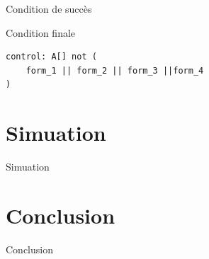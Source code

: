 \documentclass{bredelebeamer}
\begin{document}
\begin{frame}[fragile]{Condition de succès}
\begin{block}{Condition finale}
\begin{verbatim}
control: A[] not (
    form_1 || form_2 || form_3 ||form_4
)
\end{verbatim}
\end{block}
\end{frame} 

\section{Simuation}
\begin{frame}{Simuation}

\end{frame}

\section{Conclusion}
\begin{frame}{Conclusion}

\end{frame}
\end{document}
